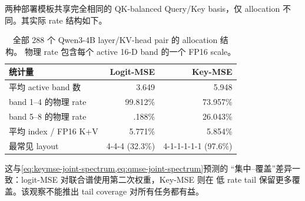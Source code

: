 两种部署模板共享完全相同的 QK-balanced Query/Key basis，仅 allocation
不同。其实际 rate 结构如下。

\begin{table}[H]
\caption{全部 288 个 Qwen3-4B layer/KV-head pair 的 allocation 结构。
物理 rate 包含每个 active 16-D band 的一个 FP16 scale。}
\label{tab:allocation-structure}
\centering
\begin{tabular}{lrr}
\toprule
统计量 & Logit-MSE & Key-MSE \\
\midrule
平均 active band 数 & 3.649 & 5.948 \\
band 1--4 的物理 rate & 99.812\% & 73.957\% \\
band 5--8 的物理 rate & .188\% & 26.043\% \\
平均 index / FP16 K+V & 5.771\% & 5.854\% \\
最常见 layout & 4-4-4 (32.3\%) & 4-1-1-1-1-1 (97.6\%) \\
\bottomrule
\end{tabular}
\end{table}

这与\cref{eq:keymse-joint-spectrum,eq:qmse-joint-spectrum}预测的
``集中--覆盖''差异一致：logit-MSE 对联合谱使用第二次权重，Key-MSE 则在
低 rate tail 保留更多覆盖。该观察不能推出 tail coverage 对所有任务都有益。

\begin{table}[H]
\caption{1\% active token 下跨模型体育/医学 trace。``Oracle mass recall''
按 Full-attention probability 加权 exact top-1\% token。}
\label{tab:rate-allocation}
\centering
{}
\end{table}

